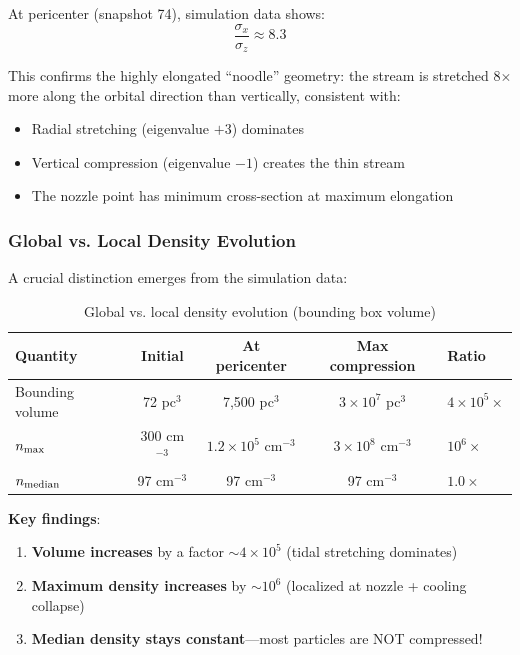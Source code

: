 \documentclass[twocolumn,amsmath,amssymb,prd,superscriptaddress,nofootinbib]{revtex4-2}
\begin{document}
At pericenter (snapshot 74), simulation data shows:
\begin{equation}
    \frac{\sigma_x}{\sigma_z} \approx 8.3
\end{equation}

This confirms the highly elongated ``noodle'' geometry: the stream is stretched 8$\times$ more along the orbital direction than vertically, consistent with:
\begin{itemize}
    \item Radial stretching (eigenvalue $+3$) dominates
    \item Vertical compression (eigenvalue $-1$) creates the thin stream
    \item The nozzle point has minimum cross-section at maximum elongation
\end{itemize}

\subsubsection{Global vs. Local Density Evolution}

A crucial distinction emerges from the simulation data:

\begin{table}[h]
\centering
\caption{Global vs. local density evolution (bounding box volume)}
\label{tab:global_local}
\begin{tabular}{lcccl}
\toprule
Quantity & Initial & At pericenter & Max compression & Ratio \\
\midrule
Bounding volume & 72 pc$^3$ & 7,500 pc$^3$ & $3 \times 10^7$ pc$^3$ & $4 \times 10^5 \times$ \\
$n_{\rm max}$ & 300 cm$^{-3}$ & $1.2 \times 10^5$ cm$^{-3}$ & $3 \times 10^8$ cm$^{-3}$ & $10^6 \times$ \\
$n_{\rm median}$ & 97 cm$^{-3}$ & 97 cm$^{-3}$ & 97 cm$^{-3}$ & $1.0 \times$ \\
\bottomrule
\end{tabular}
\end{table}

\textbf{Key findings}:
\begin{enumerate}
    \item \textbf{Volume increases} by a factor $\sim 4 \times 10^5$ (tidal stretching dominates)
    \item \textbf{Maximum density increases} by $\sim 10^6$ (localized at nozzle + cooling collapse)
    \item \textbf{Median density stays constant}---most particles are NOT compressed!
\end{enumerate}
\end{document}
